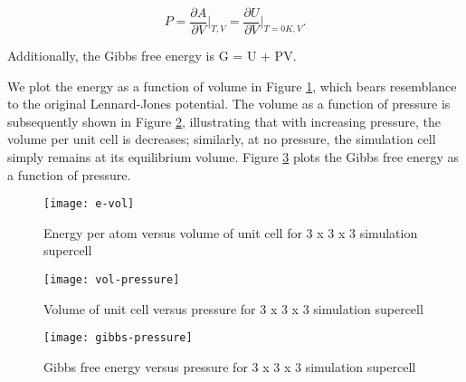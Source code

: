 \documentclass[12pt, oneside]{article}
\begin{document}
\begin{equation} 
  P = \frac{\partial A}{\partial V} \bigg|_{T,V}= \frac{\partial U}{\partial V}\bigg|_{T = 0K,V}.
\end{equation}  

\noindent Additionally, the Gibbs free energy is G = U + PV.

We plot the energy as a function of volume in Figure \ref{fig:evol}, which bears resemblance to the original Lennard-Jones potential. The volume as a function of pressure is subsequently shown in Figure \ref{fig:volp}, illustrating that with increasing pressure, the volume per unit cell is decreases; similarly, at no pressure, the simulation cell simply remains at its equilibrium volume. Figure \ref{fig:gibbsp} plots the Gibbs free energy as a function of pressure. 

\begin{figure}[htbp]
   \centering
   \texttt{[image: e-vol]} %
   \caption{Energy per atom versus volume of unit cell for 3 x 3 x 3 simulation supercell}
   \label{fig:evol}
\end{figure}

\begin{figure}[htbp]
   \centering
   \texttt{[image: vol-pressure]} %
   \caption{Volume of unit cell versus pressure for 3 x 3 x 3 simulation supercell}
   \label{fig:volp}
\end{figure}

\begin{figure}[htbp]
   \centering
   \texttt{[image: gibbs-pressure]} %
   \caption{Gibbs free energy versus pressure for 3 x 3 x 3 simulation supercell}
   \label{fig:gibbsp}
\end{figure}
\end{document}
